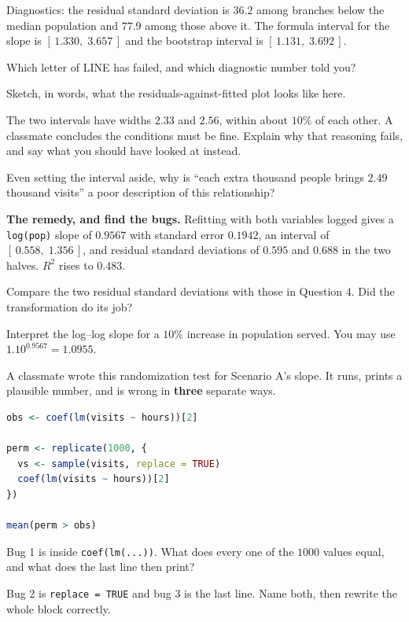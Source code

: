 \documentclass[11pt]{article}
\newcommand{\answerspace}[1]{\vspace{#1}}
\begin{document}
\begin{questions}
\noindent Diagnostics: the residual standard deviation is $36.2$ among branches below the median
population and $77.9$ among those above it. The formula interval for the slope is
$[\,1.330,\; 3.657\,]$ and the bootstrap interval is $[\,1.131,\; 3.692\,]$.

\begin{parts}
\item Which letter of LINE has failed, and which diagnostic number told you?
\answerspace{3.5em}

\item Sketch, in words, what the residuals-against-fitted plot looks like here.
\answerspace{3em}

\item The two intervals have widths $2.33$ and $2.56$, within about $10\%$ of each other. A
classmate concludes the conditions must be fine. Explain why that reasoning fails, and say what you
should have looked at instead.
\answerspace{4.5em}

\item Even setting the interval aside, why is ``each extra thousand people brings $2.49$ thousand
visits'' a poor description of this relationship?
\answerspace{4em}
\end{parts}

\item \textbf{The remedy, and find the bugs.} Refitting with both variables logged gives a
\texttt{log(pop)} slope of $0.9567$ with standard error $0.1942$, an interval of
$[\,0.558,\; 1.356\,]$, and residual standard deviations of $0.595$ and $0.688$ in the two halves.
$R^2$ rises to $0.483$.

\begin{parts}
\item Compare the two residual standard deviations with those in Question 4. Did the transformation
do its job?
\answerspace{3em}

\item Interpret the log--log slope for a $10\%$ increase in population served. You may use
$1.10^{0.9567} = 1.0955$.
\answerspace{3.5em}

\item A classmate wrote this randomization test for Scenario A's slope. It runs, prints a plausible
number, and is wrong in \textbf{three} separate ways.

\begin{lstlisting}[language=R]
obs <- coef(lm(visits ~ hours))[2]

perm <- replicate(1000, {
  vs <- sample(visits, replace = TRUE)
  coef(lm(visits ~ hours))[2]
})

mean(perm > obs)
\end{lstlisting}

Bug 1 is inside \texttt{coef(lm(...))}. What does every one of the $1000$ values equal, and what
does the last line then print?
\answerspace{4em}

\item Bug 2 is \texttt{replace = TRUE} and bug 3 is the last line. Name both, then rewrite the
whole block correctly.
\answerspace{5.5em}
\end{parts}

\end{questions}
\end{document}
